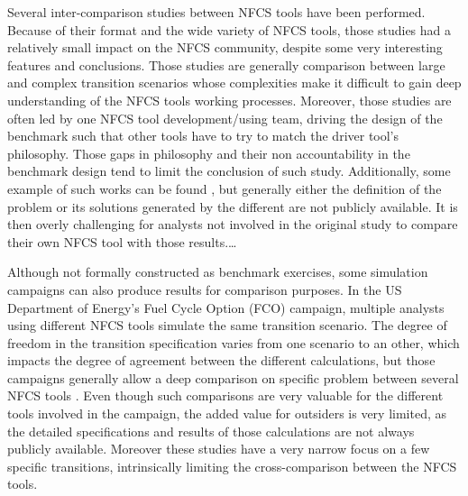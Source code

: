 Several inter-comparison studies between NFCS tools have been performed. Because
of their format and the wide variety of NFCS tools, those studies had a
relatively small impact on the NFCS community, despite some very interesting
features and conclusions.  Those studies are generally comparison between large
and complex transition scenarios whose complexities make it difficult to gain
deep understanding of the NFCS tools working processes. Moreover, those studies are
often led by one NFCS tool development/using team, driving the design of
the benchmark such that other tools have to try to match the driver tool's
philosophy. Those gaps in philosophy and their non accountability in the
benchmark design tend to limit the conclusion of such study. Additionally, some
example of such works can be found \cite{IAEA - Benchmark Study on Nuclear Fuel Cycle
Transition Scenarios} \cite{MIT - Guerin}, but generally either the definition
of the problem or its solutions generated by the different are not publicly
available. It is then overly challenging for analysts not involved in the original
study to compare their own NFCS tool with those results.\ldots

Although not formally constructed as benchmark exercises, some simulation campaigns
can also produce results for comparison purposes.  In the US Department of Energy's
Fuel Cycle Option (FCO) campaign,  multiple analysts
using different NFCS tools simulate the same transition scenario. The degree of
freedom in the transition specification varies from one scenario to an other,
which impacts the degree of agreement between the different calculations, but
those campaigns generally allow a deep comparison on specific problem between
several NFCS tools \cite{Standardized verification of fuel cycle modeling -
B.Feng}.  Even though such comparisons are very valuable for the different tools
involved in the campaign, the added value for outsiders is very limited, as the
detailed specifications and results of those calculations are not always
publicly available. Moreover these studies have a very narrow focus on a few
specific transitions, intrinsically limiting the cross-comparison between the
NFCS tools.



